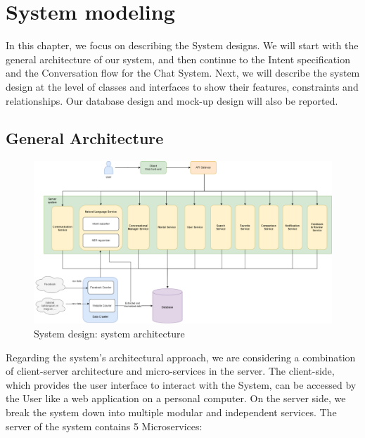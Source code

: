 \chapter{System modeling}
In this chapter, we focus on describing the System designs. We will start with the general architecture of our system, and then continue to the Intent specification and the Conversation flow for the Chat System. Next, we will describe the system design at the level of classes and interfaces to show their features, constraints and relationships. Our database design and mock-up design will also be reported.
\section{General Architecture}
\begin{figure}[H]
    \centering
    \includegraphics[width=\textwidth]{Images/System_architecture.png}
    \caption{System design: system architecture}
    \label{fig:sys-architect}
\end{figure}
Regarding the system's architectural approach, we are considering a combination of client-server architecture and micro-services in the server. The client-side, which provides the user interface to interact with the System, can be accessed by the User like a web application on a personal computer. On the server side, we break the system down into multiple modular and independent services. The server of the system contains 5 Microservices:

